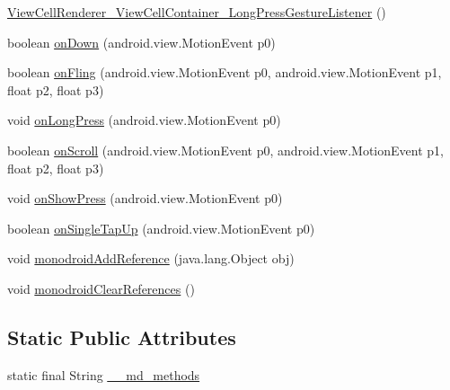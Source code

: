 \begin{CompactItemize}
\item 
\hyperlink{classmd5b60ffeb829f638581ab2bb9b1a7f4f3f_1_1_view_cell_renderer___view_cell_container___long_press_gesture_listener_92670e7b8e49a3b93ebb5a1ab9cef59c}{ViewCellRenderer\_\-ViewCellContainer\_\-LongPressGestureListener} ()
\item 
boolean \hyperlink{classmd5b60ffeb829f638581ab2bb9b1a7f4f3f_1_1_view_cell_renderer___view_cell_container___long_press_gesture_listener_c5058d423fa75bc3f59b7917a9c72270}{onDown} (android.view.MotionEvent p0)
\item 
boolean \hyperlink{classmd5b60ffeb829f638581ab2bb9b1a7f4f3f_1_1_view_cell_renderer___view_cell_container___long_press_gesture_listener_512c1b77a4466f1d9d4b72ff43c67478}{onFling} (android.view.MotionEvent p0, android.view.MotionEvent p1, float p2, float p3)
\item 
void \hyperlink{classmd5b60ffeb829f638581ab2bb9b1a7f4f3f_1_1_view_cell_renderer___view_cell_container___long_press_gesture_listener_57d6c39446287cb3e46f86c3aabfd891}{onLongPress} (android.view.MotionEvent p0)
\item 
boolean \hyperlink{classmd5b60ffeb829f638581ab2bb9b1a7f4f3f_1_1_view_cell_renderer___view_cell_container___long_press_gesture_listener_9038fcf1e8bddceea09511cb092fb088}{onScroll} (android.view.MotionEvent p0, android.view.MotionEvent p1, float p2, float p3)
\item 
void \hyperlink{classmd5b60ffeb829f638581ab2bb9b1a7f4f3f_1_1_view_cell_renderer___view_cell_container___long_press_gesture_listener_1e307ab1e1133156be97a58683b10649}{onShowPress} (android.view.MotionEvent p0)
\item 
boolean \hyperlink{classmd5b60ffeb829f638581ab2bb9b1a7f4f3f_1_1_view_cell_renderer___view_cell_container___long_press_gesture_listener_501c608fd9ac5720da0aa59fc488328e}{onSingleTapUp} (android.view.MotionEvent p0)
\item 
void \hyperlink{classmd5b60ffeb829f638581ab2bb9b1a7f4f3f_1_1_view_cell_renderer___view_cell_container___long_press_gesture_listener_65ab3a27390016d9f425a42956aadf67}{monodroidAddReference} (java.lang.Object obj)
\item 
void \hyperlink{classmd5b60ffeb829f638581ab2bb9b1a7f4f3f_1_1_view_cell_renderer___view_cell_container___long_press_gesture_listener_6663baea3c09894d07cad3f947120111}{monodroidClearReferences} ()
\end{CompactItemize}
\subsection*{Static Public Attributes}
\begin{CompactItemize}
\item 
static final String \hyperlink{classmd5b60ffeb829f638581ab2bb9b1a7f4f3f_1_1_view_cell_renderer___view_cell_container___long_press_gesture_listener_1ca45b506417154ae7b4956694d189a9}{\_\-\_\-md\_\-methods}
\end{CompactItemize}
